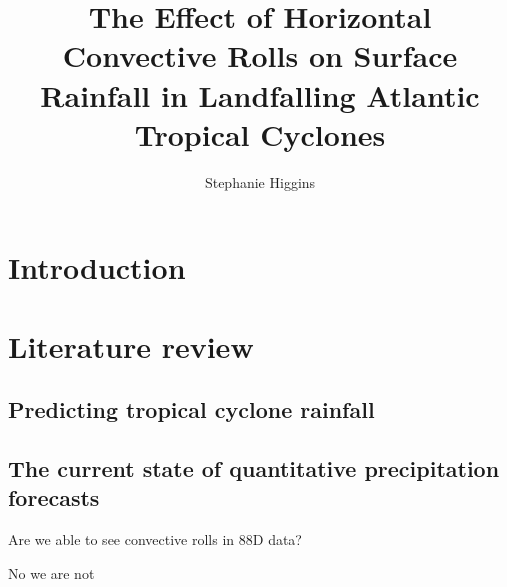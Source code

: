 \documentclass[12pt]{article}
\author{Stephanie Higgins} \title{The Effect of Horizontal Convective Rolls on Surface Rainfall in Landfalling Atlantic Tropical Cyclones}
\begin{document}
\maketitle


\section{Introduction}

\section{Literature review}

\subsection{Predicting tropical cyclone rainfall} 

\subsection{The current state of quantitative precipitation forecasts}

Are we able to see convective rolls in 88D data?

No we are not
\end{document}

